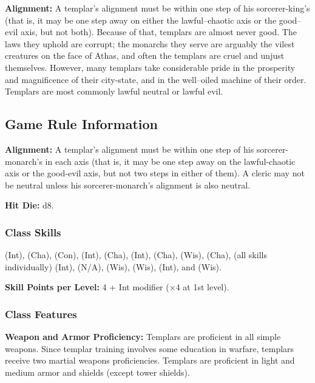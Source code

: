 \textbf{Alignment:} A templar's alignment must be within one step of his sorcerer-king's (that is, it may be one step away on either the lawful--chaotic axis or the good--evil axis, but not both). Because of that, templars are almost never good. The laws they uphold are corrupt; the monarchs they serve are arguably the vilest creatures on the face of Athas, and often the templars are cruel and unjust themselves. However, many templars take considerable pride in the prosperity and magnificence of their city-state, and in the well--oiled machine of their order. Templars are most commonly lawful neutral or lawful evil.

\subsection{Game Rule Information}

\textbf{Alignment:} A templar's alignment must be within one step of his sorcerer-monarch's in each axis (that is, it may be one step away on the lawful-chaotic axis or the good-evil axis, but not two steps in either of them). A cleric may not be neutral unless his sorcerer-monarch's alignment is also neutral.

\textbf{Hit Die:} d8.

\subsubsection{Class Skills}
 (Int),  (Cha),  (Con),  (Int),  (Cha),  (Int),  (Cha),  (Wis),  (Cha),  (all skills individually) (Int),  (N/A),  (Wis),  (Wis),  (Int), and  (Wis).

\textbf{Skill Points per Level:} 4 + Int modifier ($\times 4$ at 1st level).

\subsubsection{Class Features}

\textbf{Weapon and Armor Proficiency:} Templars are proficient in all simple weapons. Since templar training involves some education in warfare, templars receive two martial weapons proficiencies. Templars are proficient in light and medium armor and shields (except tower shields).

